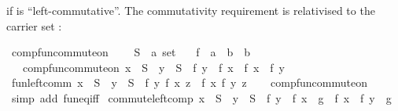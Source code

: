 \begin{isabellebody}
\begin{isamarkuptext}
  if  is ``left-commutative''.
  The commutativity requirement is relativised to the carrier set :%
\end{isamarkuptext}\isamarkuptrue%
\isamarkupfalse%
\ comp{\isacharunderscore}{\kern0pt}fun{\isacharunderscore}{\kern0pt}commute{\isacharunderscore}{\kern0pt}on\ {\isacharequal}{\kern0pt}\isanewline
\ \ \ S\ {\isacharcolon}{\kern0pt}{\isacharcolon}{\kern0pt}\ {\isachardoublequoteopen}{\isacharprime}{\kern0pt}a\ set{\isachardoublequoteclose}\isanewline
\ \ \ f\ {\isacharcolon}{\kern0pt}{\isacharcolon}{\kern0pt}\ {\isachardoublequoteopen}{\isacharprime}{\kern0pt}a\ {\isasymRightarrow}\ {\isacharprime}{\kern0pt}b\ {\isasymRightarrow}\ {\isacharprime}{\kern0pt}b{\isachardoublequoteclose}\isanewline
\ \ \ comp{\isacharunderscore}{\kern0pt}fun{\isacharunderscore}{\kern0pt}commute{\isacharunderscore}{\kern0pt}on{\isacharcolon}{\kern0pt}\ {\isachardoublequoteopen}x\ {\isasymin}\ S\ {\isasymLongrightarrow}\ y\ {\isasymin}\ S\ {\isasymLongrightarrow}\ f\ y\ {\isasymcirc}\ f\ x\ {\isacharequal}{\kern0pt}\ f\ x\ {\isasymcirc}\ f\ y{\isachardoublequoteclose}\isanewline
{}\isanewline
\isanewline
{}\isamarkupfalse%
\ fun{\isacharunderscore}{\kern0pt}left{\isacharunderscore}{\kern0pt}comm{\isacharcolon}{\kern0pt}\ {\isachardoublequoteopen}x\ {\isasymin}\ S\ {\isasymLongrightarrow}\ y\ {\isasymin}\ S\ {\isasymLongrightarrow}\ f\ y\ {\isacharparenleft}{\kern0pt}f\ x\ z{\isacharparenright}{\kern0pt}\ {\isacharequal}{\kern0pt}\ f\ x\ {\isacharparenleft}{\kern0pt}f\ y\ z{\isacharparenright}{\kern0pt}{\isachardoublequoteclose}\isanewline
%
\isadelimproof
\ \ %
\endisadelimproof
%
\isatagproof
{}\isamarkupfalse%
\ comp{\isacharunderscore}{\kern0pt}fun{\isacharunderscore}{\kern0pt}commute{\isacharunderscore}{\kern0pt}on\ \isamarkupfalse%
\ {\isacharparenleft}{\kern0pt}simp\ add{\isacharcolon}{\kern0pt}\ fun{\isacharunderscore}{\kern0pt}eq{\isacharunderscore}{\kern0pt}iff{\isacharparenright}{\kern0pt}%
\endisatagproof
{\isafoldproof}%
%
\isadelimproof
\isanewline
%
\endisadelimproof
\isanewline
{}\isamarkupfalse%
\ commute{\isacharunderscore}{\kern0pt}left{\isacharunderscore}{\kern0pt}comp{\isacharcolon}{\kern0pt}\ {\isachardoublequoteopen}x\ {\isasymin}\ S\ {\isasymLongrightarrow}\ y\ {\isasymin}\ S\ {\isasymLongrightarrow}\ f\ y\ {\isasymcirc}\ {\isacharparenleft}{\kern0pt}f\ x\ {\isasymcirc}\ g{\isacharparenright}{\kern0pt}\ {\isacharequal}{\kern0pt}\ f\ x\ {\isasymcirc}\ {\isacharparenleft}{\kern0pt}f\ y\ {\isasymcirc}\ g{\isacharparenright}{\kern0pt}{\isachardoublequoteclose}\isanewline

\end{isabellebody}
